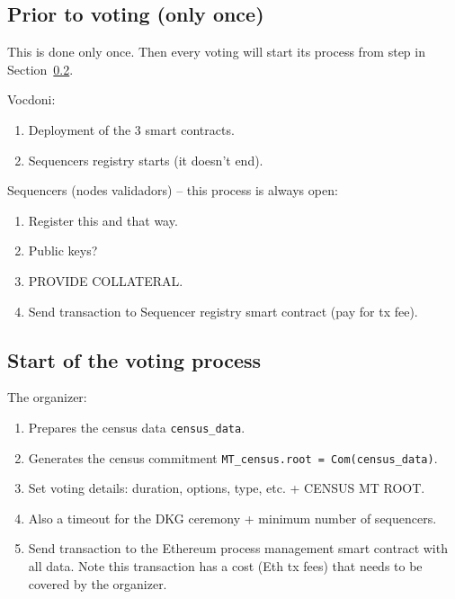 \subsection{Prior to voting (only once)}
\label{sec:vocdoni-protocol:prior-steps}


This is done only once. Then every voting will start its process from step in Section~\ref{sec:vocdoni-protocol:start}.

Vocdoni:
\begin{enumerate}
	\item Deployment of the 3 smart contracts.
	\item Sequencers registry starts (it doesn't end).
\end{enumerate}

Sequencers (nodes validadors) -- this process is always open:
\begin{enumerate}
	\item Register this and that way.
	\item Public keys?
	\item PROVIDE COLLATERAL.
	\item Send transaction to Sequencer registry smart contract (pay for tx fee).
\end{enumerate}

\subsection{Start of the voting process}
\label{sec:vocdoni-protocol:start}

The organizer:
\begin{enumerate}
	\item Prepares the census data \texttt{census\_data}.
	\item Generates the census commitment \texttt{MT\_census.root = Com(census\_data)}.
	\item Set voting details: duration, options, type, etc. + CENSUS MT ROOT.
	\item Also a timeout for the DKG ceremony + minimum number of sequencers.
	\item Send transaction to the Ethereum process management smart contract with all data. Note this transaction has a cost (Eth tx fees) that needs to be covered by the organizer.
\end{enumerate}

